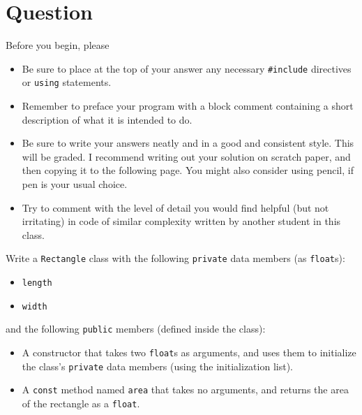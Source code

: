 




\docCopyright


\newEvenPage

\section{Question}

Before you begin, please
\begin{itemize}
  \item Be sure to place at the top of your answer any necessary
    \texttt{#include} directives or \texttt{using}
    statements.
  \item Remember to preface your program with a block comment containing a
    short description of what it is intended to do.
  \item Be sure to write your answers neatly and in a good and consistent
    style.  This will be graded.  I recommend writing out your solution on
    scratch paper, and then copying it to the following page.  You might also
    consider using pencil, if pen is your usual choice.
  \item Try to comment with the level of detail you would find helpful (but not
    irritating) in code of similar complexity written by another student in
    this class.
\end{itemize}

Write a \texttt{Rectangle} class with the following
\texttt{private} data members (as \texttt{float}s):
\begin{itemize}
  \item \texttt{length}
  \item \texttt{width}
\end{itemize}
and the following \texttt{public} members (defined inside the class):
\begin{itemize}
  \item A constructor that takes two \texttt{float}s as arguments, and
    uses them to initialize the class's \texttt{private} data members
    (using the initialization list).
  \item A \texttt{const} method named \texttt{area} that
    takes no arguments, and returns the area of the rectangle as a
    \texttt{float}.
\end{itemize}

